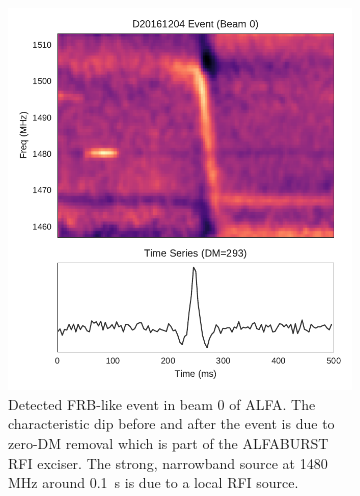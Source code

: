 \documentclass[a4paper,fleqn,usenatbib]{mnras}
\begin{document}
\begin{figure}
    \centering
    \begin{subfigure}[t]{0.45\textwidth}
        \centering\captionsetup{width=.95\linewidth}
        \includegraphics[width=1.0\textwidth]{figures/D20161204_buf23_Beam0.pdf}
        \caption{Detected FRB-like event in beam 0 of ALFA. The characteristic
        dip before and after the event is due to zero-DM removal which is part
        of the ALFABURST RFI exciser. The strong, narrowband source at 1480 MHz
        around 0.1~s is due to a local RFI source.}
        \label{fig:beam0_dynamic_spec}
    \end{subfigure}
    \begin{subfigure}[t]{0.45\textwidth}
        \centering\captionsetup{width=.95\linewidth}

\end{subfigure}
\end{figure}
\end{document}
